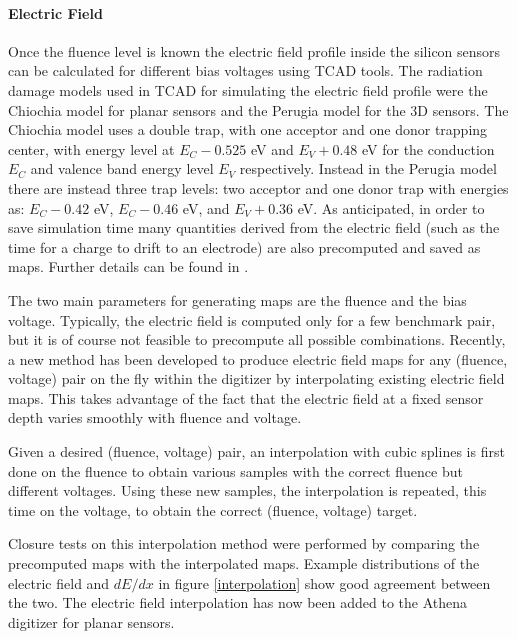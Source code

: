 \paragraph*{Electric Field}
Once the fluence level is known the electric field profile inside the silicon sensors can be 
calculated for different bias voltages using TCAD tools.
The radiation damage models used in TCAD for simulating the electric field profile were the Chiochia model \cite{mod:Chiochia} for planar sensors and the Perugia model \cite{Perugia} for the 3D sensors. The Chiochia model uses a double trap, with one acceptor and one donor trapping center, with energy level at $E_C-0.525$ eV and $E_V+0.48$ eV for the conduction $E_C$ and valence band energy level $E_V$ respectively. Instead in the Perugia model there are instead three trap levels: two acceptor and one donor trap with energies as: $E_C-0.42$ eV, $E_C-0.46$ eV, and $E_V+0.36$ eV. 
As anticipated, in order to save simulation time many quantities derived from the electric field (such as the time for a charge to drift to an electrode) are also precomputed and saved as maps. Further details can be found in \cite{Aaboud_2019}.


The two main parameters for generating maps are the fluence and the bias voltage. Typically, the electric field is computed only for a few benchmark pair, but it is of course not feasible to precompute all possible combinations. Recently, a new method has been developed to produce 
electric field maps for any (fluence, voltage) pair on the fly within the digitizer by interpolating existing electric field maps. This takes advantage of the fact that the electric field at a fixed sensor depth varies smoothly with fluence and voltage.

Given a desired (fluence, voltage) pair, an interpolation with cubic splines is first done on the fluence to obtain various samples with the correct fluence but different voltages. Using these new samples, the interpolation is repeated, this time on the voltage, to obtain the correct (fluence, voltage) target. 

Closure tests on this interpolation method were performed by comparing the precomputed maps with the interpolated maps. Example distributions of the electric field and $dE/dx$ in figure \ref{interpolation} show good agreement between the two. The electric field interpolation has now been added to the Athena digitizer for planar sensors.

